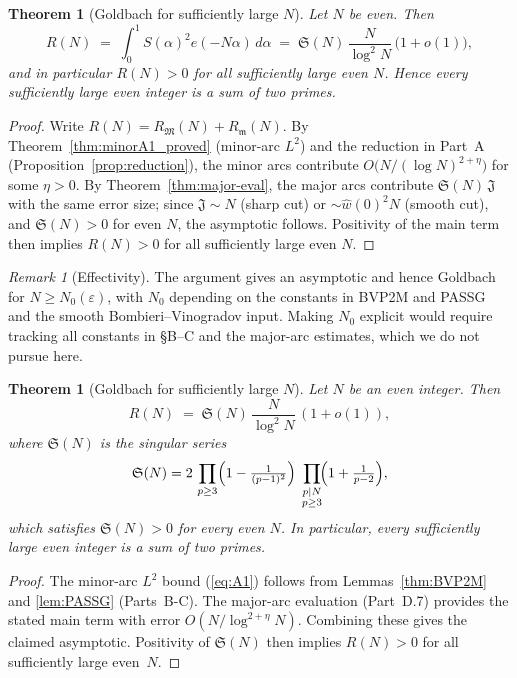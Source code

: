 \documentclass[11pt]{article}
\def\eqref#1{(\ref{#1})}%
\newtheorem{theorem}[lemma]{Theorem}
\theoremstyle{definition}
\theoremstyle{remark}
\newtheorem{remark}[lemma]{Remark}
\numberwithin{equation}{part}
\begin{document}
\begin{theorem}[Goldbach for sufficiently large $N$]\label{thm:goldbach_final}
	Let $N$ be even. Then
	\[
		R(N)\;=\;\int_0^1 S(\alpha)^2 e(-N\alpha)\,d\alpha
		\;=\;\mathfrak S(N)\,\frac{N}{\log^2 N}\,\bigl(1+o(1)\bigr),
	\]
	and in particular $R(N)>0$ for all sufficiently large even $N$. Hence every sufficiently large even integer is a sum of two primes.
\end{theorem}

\begin{proof}
	Write $R(N)=R_{\mathfrak M}(N)+R_{\mathfrak m}(N)$.
	By Theorem~\ref{thm:minorA1_proved} (minor-arc $L^2$) and the reduction in Part~A (Proposition~\ref{prop:reduction}), the minor arcs contribute $O\big(N/(\log N)^{2+\eta}\big)$ for some $\eta>0$.
	By Theorem~\ref{thm:major-eval}, the major arcs contribute $\mathfrak S(N)\,\mathfrak J$ with the same error size; since $\mathfrak J\sim N$ (sharp cut) or $\sim \widehat w(0)^2N$ (smooth cut), and $\mathfrak S(N)>0$ for even $N$, the asymptotic follows. Positivity of the main term then implies $R(N)>0$ for all sufficiently large even $N$.
\end{proof}

\begin{remark}[Effectivity]
	The argument gives an asymptotic and hence Goldbach for $N\ge N_0(\varepsilon)$, with $N_0$ depending on the constants in BVP2M and PASSG and the smooth Bombieri–Vinogradov input. Making $N_0$ explicit would require tracking all constants in \S B--C and the major-arc estimates, which we do not pursue here.
\end{remark}


\begin{theorem}[Goldbach for sufficiently large $N$]\label{thm:goldbach}
	Let $N$ be an even integer. Then
	\[
		R(N)\;=\;\mathfrak S(N)\,\frac{N}{\log^2 N}\,(1+o(1)),
	\]
	where $\mathfrak S(N)$ is the singular series
	\[
		\mathfrak S(N)
		=2\,\prod_{p\ge 3}\Bigl(1-\tfrac{1}{(p-1)^2}\Bigr)
		\;\prod_{\substack{p\mid N\\ p\ge 3}}\!\Bigl(1+\tfrac{1}{p-2}\Bigr),
	\]
	which satisfies $\mathfrak S(N)>0$ for every even $N$.
	In particular, every sufficiently large even integer is a sum of two primes.
\end{theorem}

\begin{proof}
	The minor-arc $L^2$ bound \eqref{eq:A1} follows from
	Lemmas~\ref{thm:BVP2M} and \ref{lem:PASSG} (Parts~B-C).
	The major-arc evaluation (Part~D.7) provides the stated main term with error $O(N/\log^{2+\eta}N)$.
	Combining these gives the claimed asymptotic.
	Positivity of $\mathfrak S(N)$ then implies $R(N)>0$ for all sufficiently large even~$N$.
\end{proof}
\end{document}

